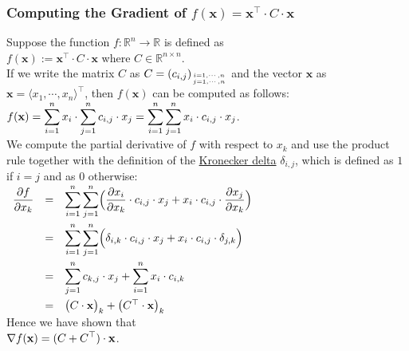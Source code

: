\subsubsection{Computing the Gradient of $f(\mathbf{x}) = \mathbf{x}^\top \cdot C \cdot \mathbf{x}$}
Suppose the function $f:\mathbb{R}^n \rightarrow \mathbb{R}$ is defined as
\\[0.2cm]
\hspace*{1.3cm}
$f(\mathbf{x}) := \mathbf{x}^\top \cdot C \cdot \mathbf{x}$ \quad where $C \in \mathbb{R}^{n \times n}$.
\\[0.2cm]
If we write the matrix $C$ as $C = (c_{i,j})_{i=1,\cdots,n \atop j=1,\cdots,n}$ and the vector
$\mathbf{x}$ as $\mathbf{x} = \langle x_1, \cdots, x_n \rangle^\top$,  then $f(\mathbf{x})$ can be
computed as follows:
\\[0.2cm]
\hspace*{1.3cm}
$\displaystyle f(\mathbf{x}) = \sum\limits_{i=1}^n x_i \cdot \sum\limits_{j=1}^n c_{i,j} \cdot x_j 
                   = \sum\limits_{i=1}^n \sum\limits_{j=1}^n x_i \cdot c_{i,j} \cdot x_j
$.
\\[0.2cm]
We compute the partial derivative of $f$ with respect to $x_k$ and use the product rule together with the
definition of the \href{https://en.wikipedia.org/wiki/Kronecker_delta}{Kronecker delta} $\delta_{i,j}$, which
is defined as $1$ if $i = j$ and as $0$ otherwise:
\\[0.2cm]
\hspace*{1.3cm}
$
\begin{array}[t]{lcl}
\displaystyle \frac{\partial f}{\partial x_k} & = &
\displaystyle \sum\limits_{i=1}^n \sum\limits_{j=1}^n \Bigl(
    \frac{\partial x_i}{\partial x_k} \cdot c_{i,j} \cdot x_j + x_i \cdot c_{i,j} \cdot \frac{\partial x_j}{\partial x_k}
    \Bigr) \\[0.5cm]
& = &
\displaystyle \sum\limits_{i=1}^n \sum\limits_{j=1}^n \Bigl(
    \delta_{i,k} \cdot c_{i,j} \cdot x_j + x_i \cdot c_{i,j} \cdot \delta_{j,k} \Bigr) \\[0.5cm]
& = &
\displaystyle \sum\limits_{j=1}^n c_{k,j} \cdot x_j + \sum\limits_{i=1}^n x_i \cdot c_{i,k} \\[0.5cm]
& = &
  \bigl(C \cdot \mathbf{x}\bigr)_k + \bigl(C^\top \cdot \mathbf{x}\bigr)_k
\end{array}
$
\\[0.2cm]
Hence we have shown that 
\\[0.2cm]
\hspace*{1.3cm}
$\displaystyle \nabla f(\mathbf{x}) = (C + C^\top) \cdot \mathbf{x}$.
\\[0.2cm]
